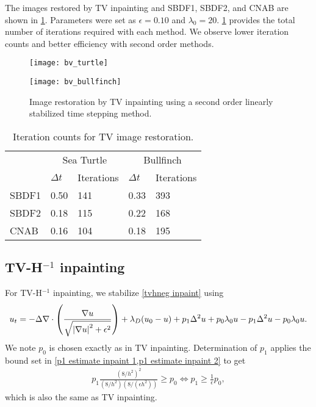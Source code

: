 The images restored by TV inpainting and SBDF1, SBDF2, and CNAB are shown in \cref{fig:bv inpainting}. Parameters were set as $\epsilon=0.10$ and $\lambda_0=20$. \cref{tab:bv iter counts} provides the total number of iterations required with each method. We observe lower iteration counts and better efficiency with second order methods.
\begin{figure}[htb!]
\centering
\begin{minipage}{0.65\textwidth}
	\texttt{[image: bv\_turtle]}
\end{minipage}
\begin{minipage}{0.65\textwidth}
	\texttt{[image: bv\_bullfinch]}
\end{minipage}
\caption[Image restoration by TV inpainting]{Image restoration by TV inpainting using a second order linearly stabilized time stepping method.}
\label{fig:bv inpainting}
\end{figure}


\begin{table}[htb!]
\caption[Iteration counts for TV image restoration]{Iteration counts for TV image restoration.}
        \centering\begin{tabular}{lll ll} \toprule[1.25pt]
& \multicolumn{2}{c}{Sea Turtle} & \multicolumn{2}{c}{Bullfinch}
\\
& $\Delta t$ & Iterations & $\Delta t$ & Iterations
\\ \midrule
SBDF1 & 0.50 & 141 & 0.33 & 393 
\\
SBDF2& 0.18 & 115 & 0.22 & 168
\\             
CNAB &  0.16 & 104 & 0.18 & 195
\\ \bottomrule[1.25pt]
\end{tabular}
\label{tab:bv iter counts}
\end{table}

\subsection{TV-H\texorpdfstring{$^{-1}$}{-1} inpainting}
For TV-H$^{-1}$ inpainting, we stabilize \cref{tvhneg inpaint} using
\begin{align}
        u_t = -\Delta \nabla \cdot \left(\frac{\nabla u}{\sqrt{\left|\nabla u\right|^2 + \epsilon^2}} \right) + \lambda_D(u_0 - u)  + p_1\Delta^2 u + p_0\lambda_0 u - p_1\Delta^2 u - p_0\lambda_0 u.
\label{tvhneg stabilized}
\end{align}
We note $p_0$ is chosen exactly as in TV inpainting. Determination of $p_1$ applies the bound set in \cref{p1 estimate inpaint 1,p1 estimate inpaint 2} to get 
\begin{align}
        p_1\frac{(8/h^2)^2}{(8/h^2)(8/(\epsilon h^2))} \geq p_0 
\iff p_1 \geq \frac{1}{\epsilon}p_0,
\end{align}
which is also the same as TV inpainting.

